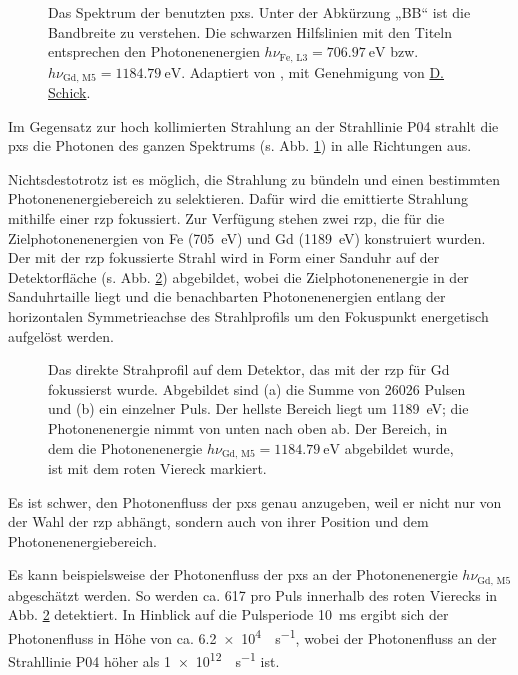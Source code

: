 \begin{figure}[H]
    \centering
    
    \caption{Das Spektrum der benutzten \gls{pxs}. Unter der Abkürzung „BB“ ist die Bandbreite zu verstehen. Die schwarzen Hilfslinien mit den Titeln entsprechen den Photonenenergien $h\nu_{\text{Fe, L3}} = \SI{706.97}{\eV}$ bzw. $h\nu_{\text{Gd, M5}} = \SI{1184,79}{\eV}$. Adaptiert von \cite{schick_laser-driven_2021}, mit Genehmigung von \href{https://orcid.org/0000-0001-7988-6489}{D. Schick}.}
    \label{fig:pxs_spectrum}
\end{figure}
\noindent
Im Gegensatz zur hoch kollimierten Strahlung an der Strahllinie P04 strahlt die \gls{pxs} die Photonen des ganzen Spektrums (s. Abb. \ref{fig:pxs_spectrum}) in alle Richtungen aus.

\noindent
Nichtsdestotrotz ist es möglich, die Strahlung zu bündeln und einen bestimmten Photonenenergiebereich zu selektieren. Dafür wird die emittierte Strahlung mithilfe einer \gls{rzp} fokussiert. Zur Verfügung stehen zwei \gls{rzp}, die für die Zielphotonenenergien von Fe (\SI{705}{\eV}) und Gd (\SI{1189}{\eV}) konstruiert wurden. Der mit der \gls{rzp} fokussierte Strahl wird in Form einer Sanduhr auf der Detektorfläche (s. Abb. \ref{fig:butterfly_moench}) abgebildet, wobei die Zielphotonenenergie in der Sanduhrtaille liegt und die benachbarten Photonenenergien entlang der horizontalen Symmetrieachse des Strahlprofils um den Fokuspunkt energetisch aufgelöst werden.
\begin{figure}[H]
    \centering
    
    \label{fig:butterfly_moench_sum}
    \caption{Das direkte Strahprofil auf dem Detektor, das mit der \gls{rzp} für Gd fokussierst wurde. Abgebildet sind (a) die Summe von 26026 Pulsen und (b) ein einzelner Puls. Der hellste Bereich liegt um \SI{1189}{\eV}; die Photonenenergie nimmt von unten nach oben ab. Der Bereich, in dem die Photonenenergie $h\nu_{\text{Gd, M5}} = \SI{1184,79}{\eV}$ abgebildet wurde, ist mit dem roten Viereck markiert.}
    \label{fig:butterfly_moench}
\end{figure}
\noindent
Es ist schwer, den Photonenfluss der \gls{pxs} genau anzugeben, weil er nicht nur von der Wahl der \gls{rzp} abhängt, sondern auch von ihrer Position und dem  Photonenenergiebereich.

\noindent
Es kann beispielsweise der Photonenfluss der \gls{pxs} an der Photonenenergie $h\nu_\text{Gd, M5}$ abgeschätzt werden. So werden ca. \SI{617}{\photons} pro Puls innerhalb des roten Vierecks in Abb. \ref{fig:butterfly_moench} detektiert. In Hinblick auf die Pulsperiode \SI{10}{\milli\second} ergibt sich der Photonenfluss in Höhe von ca. \SI[per-mode = symbol]{6.2e4}{\photons\per\second}, wobei der Photonenfluss an der Strahllinie P04 höher als \SI[per-mode = symbol]{1e12}{\photons\per\second} ist.

